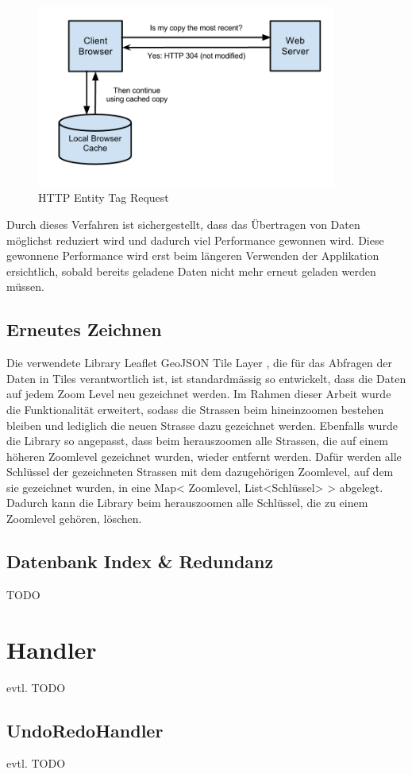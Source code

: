 \begin{figure}[H]
\centering
\includegraphics[height=6cm]{images/browser_etag.jpg}
\caption{HTTP Entity Tag Request \cite{HTTPCacheHeaders}}
\label{pic:browser_etag}
\end{figure}
\noindent
Durch dieses Verfahren ist sichergestellt, dass das Übertragen von Daten möglichst reduziert wird und dadurch viel Performance gewonnen wird. Diese gewonnene Performance wird erst beim längeren Verwenden der Applikation ersichtlich, sobald bereits geladene Daten nicht mehr erneut geladen werden müssen.
\subsection{Erneutes Zeichnen}
Die verwendete Library \glqq{}Leaflet GeoJSON Tile Layer\grqq{} \cite{LeafletGeoJSON}, die für das Abfragen der Daten in Tiles verantwortlich ist, ist standardmässig so entwickelt, dass die Daten auf jedem Zoom Level neu gezeichnet werden. Im Rahmen dieser Arbeit wurde die Funktionalität erweitert, sodass die Strassen beim hineinzoomen bestehen bleiben und lediglich die neuen Strasse dazu gezeichnet werden. Ebenfalls wurde die Library so angepasst, dass  beim herauszoomen alle Strassen, die auf einem höheren Zoomlevel gezeichnet wurden, wieder entfernt werden. Dafür werden alle Schlüssel der gezeichneten Strassen mit dem dazugehörigen Zoomlevel, auf dem sie gezeichnet wurden, in eine Map< Zoomlevel, List<Schlüssel> > abgelegt. Dadurch kann die Library beim herauszoomen alle Schlüssel, die zu einem Zoomlevel gehören, löschen.
\subsection{Datenbank Index \& Redundanz}
TODO
\section{Handler}
evtl. TODO
\subsection{UndoRedoHandler}
evtl. TODO
